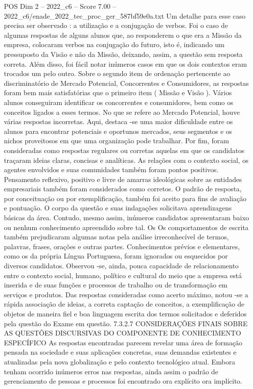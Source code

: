 \begin{textsample}{POS Dim 2 – 2022\_c6 – Score 7.00 – 2022\_c6/enade\_2022\_tec\_proc\_ger\_587bf59e0a.txt}
Um detalhe para esse caso precisa ser observado : a utilização e a conjugação de verbos.
Foi o caso de algumas respostas de alguns alunos que, ao responderem o que era a Missão da empresa, colocaram verbos na conjugação do futuro, isto é, indicando um pressuposto da Visão e não da Missão, deixando, assim, a questão sem resposta correta.
Além disso, foi fácil notar inúmeros casos em que os dois contextos eram trocados um pelo outro.
Sobre o segundo item de ordenação pertencente ao discriminatório de Mercado Potencial, Concorrentes e Consumidores, as respostas foram bem mais satisfatórias que o primeiro item ( Missão e Visão ).
Vários alunos conseguiram identificar os concorrentes e consumidores, bem como os conceitos ligados a esses termos.
No que se refere ao Mercado Potencial, houve várias respostas incorretas.
Aqui, destaca -se uma maior dificuldade entre os alunos para encontrar potenciais e oportunos mercados, seus segmentos e os nichos proveitosos em que uma organização pode trabalhar.
Por fim, foram consideradas como respostas regulares ou corretas aquelas em que os candidatos traçaram ideias claras, concisas e analíticas.
As relações com o contexto social, os agentes envolvidos e suas comunidades também foram pontos positivos.
Pensamento reflexivo, positivo e livre de amarras ideológicas sobre as entidades empresariais também foram considerados como corretos.
O padrão de resposta, por conceituação ou por exemplificação, também foi aceito para fins de avaliação e pontuação.
O corpo da questão e suas indagações solicitava aprendizagens básicas da área.
Contudo, mesmo assim, inúmeros candidatos apresentaram baixo ou nenhum conhecimento apreendido sobre tal.
Os Os comportamentos de escrita também prejudicaram algumas notas pela análise irreconhecível de termos, palavras, frases, orações e outras partes.
Conhecimentos prévios e elementares, como os da própria Língua Portuguesa, foram ignorados ou esquecidos por diversos candidatos.
Observou -se, ainda, pouca capacidade de relacionamento entre o contexto social, humano, político e cultural do meio que a empresa está inserida e de suas funções e processos de trabalho ou de transformação em serviços e produtos.
Das respostas consideradas como acerto máximo, notou -se a rápida associação de ideias, a correta captação de conceitos, a exemplificação de objetos de maneira fiel e boa linguagem escrita dos termos solicitados e deferidos pela questão do Exame em questão. 7.3.2.7 CONSIDERAÇÕES FINAIS SOBRE AS QUESTÕES DISCURSIVAS DO COMPONENTE DE CONHECIMENTO ESPECÍFICO As respostas encontradas parecem revelar uma área de formação pensada na sociedade e suas aplicações concretas, suas demandas existentes e atualizadas pela nova globalização e pelo contexto tecnológico atual.
Embora tenham ocorrido inúmeros erros nas respostas, ainda assim o padrão de gerenciamento de pessoas e processos foi encontrado ora explícito ora implícito.

\end{textsample}
